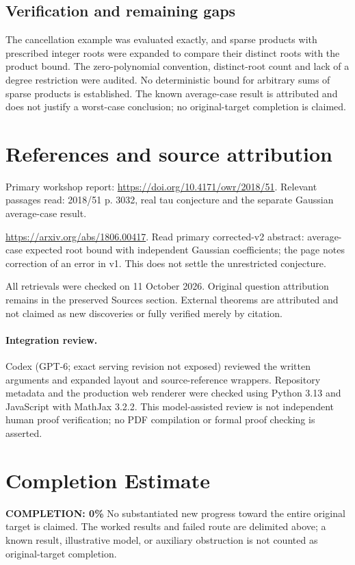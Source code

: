 \documentclass[11pt]{article}
\begin{document}
\subsection{Verification and remaining gaps}
The cancellation example was evaluated exactly, and sparse products with prescribed integer roots were expanded to compare their distinct roots with the product bound. The zero-polynomial convention, distinct-root count and lack of a degree restriction were audited. No deterministic bound for arbitrary sums of sparse products is established. The known average-case result is attributed and does not justify a worst-case conclusion; no original-target completion is claimed.

\section{References and source attribution}
Primary workshop report: \url{https://doi.org/10.4171/owr/2018/51}. Relevant passages read: 2018/51 p. 3032, real tau conjecture and the separate Gaussian average-case result.

\url{https://arxiv.org/abs/1806.00417}. Read primary corrected-v2 abstract: average-case expected root bound with independent Gaussian coefficients; the page notes correction of an error in v1. This does not settle the unrestricted conjecture.

All retrievals were checked on 11 October 2026. Original question attribution remains in the preserved Sources section. External theorems are attributed and not claimed as new discoveries or fully verified merely by citation.


\paragraph{Integration review.} Codex (GPT-6; exact serving revision not exposed) reviewed the written arguments and expanded layout and source-reference wrappers. Repository metadata and the production web renderer were checked using Python 3.13 and JavaScript with MathJax 3.2.2. This model-assisted review is not independent human proof verification; no PDF compilation or formal proof checking is asserted.

\section{Completion Estimate}
\noindent\textbf{COMPLETION: 0\%}
No substantiated new progress toward the entire original target is claimed. The worked results and failed route are delimited above; a known result, illustrative model, or auxiliary obstruction is not counted as original-target completion.
\end{document}
